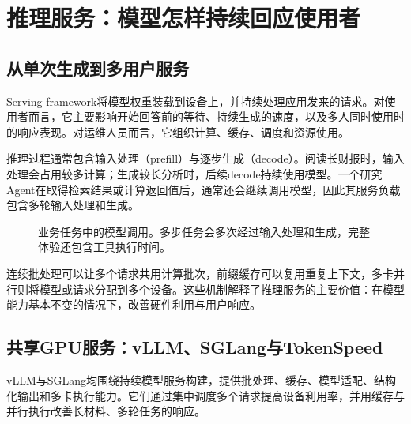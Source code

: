 \section{推理服务：模型怎样持续回应使用者}

\subsection{从单次生成到多用户服务}
Serving framework将模型权重装载到设备上，并持续处理应用发来的请求。对使用者而言，它主要影响开始回答前的等待、持续生成的速度，以及多人同时使用时的响应表现。对运维人员而言，它组织计算、缓存、调度和资源使用。

推理过程通常包含输入处理（prefill）与逐步生成（decode）。阅读长财报时，输入处理会占用较多计算；生成较长分析时，后续decode持续使用模型。一个研究Agent在取得检索结果或计算返回值后，通常还会继续调用模型，因此其服务负载包含多轮输入处理和生成。

\begin{figure}[H]\centering
{}
\caption{业务任务中的模型调用。多步任务会多次经过输入处理和生成，完整体验还包含工具执行时间。}
\end{figure}

连续批处理可以让多个请求共用计算批次，前缀缓存可以复用重复上下文，多卡并行则将模型或请求分配到多个设备。这些机制解释了推理服务的主要价值：在模型能力基本不变的情况下，改善硬件利用与用户响应。

\subsection{共享GPU服务：vLLM、SGLang与TokenSpeed}
vLLM与SGLang均围绕持续模型服务构建，提供批处理、缓存、模型适配、结构化输出和多卡执行能力。它们通过集中调度多个请求提高设备利用率，并用缓存与并行执行改善长材料、多轮任务的响应。

